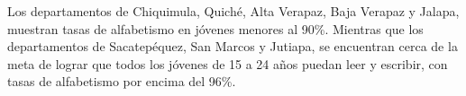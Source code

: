 Los departamentos de Chiquimula, Quiché, Alta Verapaz, Baja Verapaz y Jalapa, muestran tasas de alfabetismo en jóvenes menores al 90\%. Mientras que los departamentos de Sacatepéquez, San Marcos y Jutiapa, se encuentran cerca de la meta de lograr que todos los jóvenes de 15 a 24 años puedan leer y escribir, con tasas de alfabetismo por encima del 96\%.